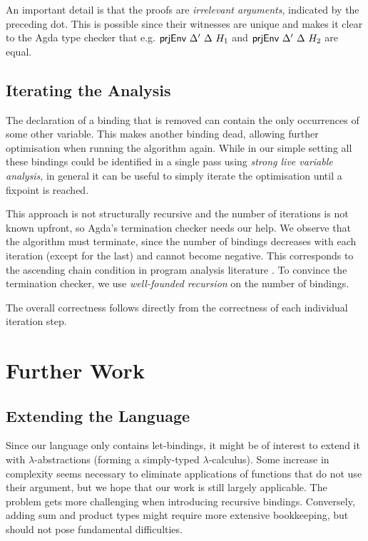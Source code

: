 \documentclass[11pt,a4paper]{article}
\begin{document}
An important detail is that the \AgdaFunction{$\subseteq$} proofs
are \emph{irrelevant arguments}, indicated by the preceding dot.
This is possible since their witnesses are unique
and makes it clear to the Agda type checker that e.g.
$\AgdaFunction{prjEnv}\ \Delta'\ \Delta\ H_1$ and
$\AgdaFunction{prjEnv}\ \Delta'\ \Delta\ H_2$ are equal.


\subsection{Iterating the Analysis}

The declaration of a binding that is removed
can contain the only occurrences of some other variable.
This makes another binding dead, allowing further optimisation when running the algorithm again.
While in our simple setting all these bindings could be identified in a single pass
using \emph{strong live variable analysis},
in general it can be useful to simply iterate the optimisation until a fixpoint is reached.

This approach is not structurally recursive and the number of iterations is not known upfront,
so Agda's termination checker needs our help.
We observe that the algorithm must terminate,
since the number of bindings decreases with each iteration
(except for the last) and cannot become negative.
This corresponds to the ascending chain condition in program analysis literature
\cite{nielsen1999analysis}.
To convince the termination checker, we use \emph{well-founded recursion} \cite{bove2016recursion}
on the number of bindings.

The overall correctness follows directly from the correctness of each individual iteration step.


\section{Further Work}

\subsection{Extending the Language}

Since our language only contains let-bindings,
it might be of interest to extend it with $\lambda$-abstractions
(forming a simply-typed $\lambda$-calculus).
Some increase in complexity seems necessary to eliminate applications of
functions that do not use their argument,
but we hope that our work is still largely applicable.
The problem gets more challenging when introducing recursive bindings.
Conversely, adding sum and product types might require more extensive bookkeeping,
but should not pose fundamental difficulties.
\end{document}
